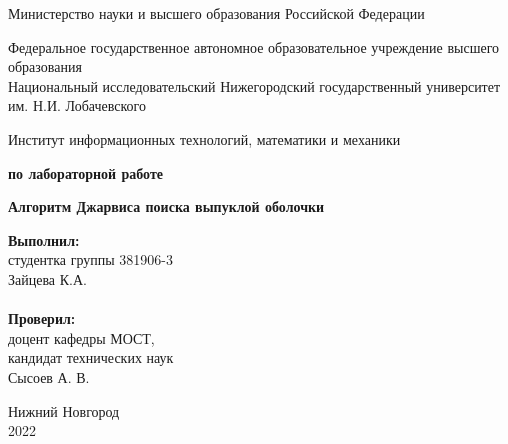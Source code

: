 \documentclass{report}
\begin{document}
\begin{titlepage}

\begin{center}
Министерство науки и высшего образования Российской Федерации
\end{center}

\begin{center}
Федеральное государственное автономное образовательное учреждение высшего образования \\
Национальный исследовательский Нижегородский государственный университет им. Н.И. Лобачевского
\end{center}

\begin{center}
Институт информационных технологий, математики и механики
\end{center}

\vspace{4em}

\begin{center}
\textbf{ по лабораторной работе} \\
\end{center}
\begin{center}
\textbf{\Large Алгоритм Джарвиса поиска выпуклой оболочки} \\
\end{center}

\vspace{4em}

\newbox{\lbox}
\newlength{\maxl}
\setlength{\maxl}{\wd\lbox}
\hfill\parbox{7cm}{
\hspace*{5cm}\hspace*{-5cm}\textbf{Выполнил:} \\ студентка группы 381906-3 \\ Зайцева К.А. \\
\\
\hspace*{5cm}\hspace*{-5cm}\textbf{Проверил:}\\ доцент кафедры МОСТ, \\ кандидат технических наук \\ Сысоев А. В.\\
}
\vspace{\fill}

\begin{center} Нижний Новгород \\ 2022 \end{center}

\end{titlepage}
\end{document}
